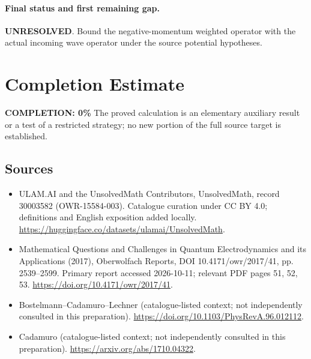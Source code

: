 \documentclass[11pt]{article}
\begin{document}
\paragraph{Final status and first remaining gap.}
\textbf{UNRESOLVED}. Bound the negative-momentum weighted operator with the actual incoming wave operator under the source potential hypotheses.

\section{Completion Estimate}
\noindent\textbf{COMPLETION: 0\%}
The proved calculation is an elementary auxiliary result or a test of a restricted strategy; no new portion of the full source target is established.

\subsection{Sources}
\begin{itemize}
\item[\hypertarget{source:30003582:1}{S1}] ULAM.AI and the UnsolvedMath Contributors, UnsolvedMath, record 30003582 (OWR-15584-003). Catalogue curation under CC BY 4.0; definitions and English exposition added locally.
\url{https://huggingface.co/datasets/ulamai/UnsolvedMath}.
\item[\hypertarget{source:30003582:2}{S2}] Mathematical Questions and Challenges in Quantum Electrodynamics and its Applications (2017), Oberwolfach Reports, DOI 10.4171/owr/2017/41, pp. 2539--2599. Primary report accessed 2026-10-11; relevant PDF pages 51, 52, 53.
\url{https://doi.org/10.4171/owr/2017/41}.
\item[\hypertarget{source:30003582:3}{S3}] Bostelmann--Cadamuro--Lechner (catalogue-listed context; not independently consulted in this preparation).
\url{https://doi.org/10.1103/PhysRevA.96.012112}.
\item[\hypertarget{source:30003582:4}{S4}] Cadamuro (catalogue-listed context; not independently consulted in this preparation).
\url{https://arxiv.org/abs/1710.04322}.
\end{itemize}
\label{end:30003582}
\end{document}
